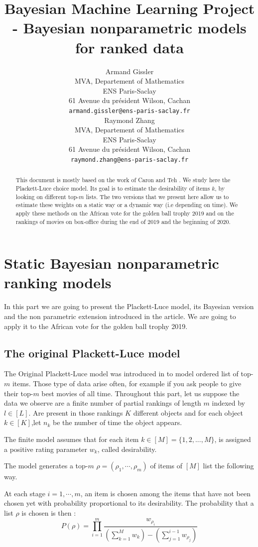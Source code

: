 \documentclass{article}
\title{Bayesian Machine Learning Project - Bayesian nonparametric models for ranked data}
\author{%
  Armand Gissler\\
  MVA, Departement of Mathematics\\
  ENS Paris-Saclay\\
  61 Avenue du président Wilson, Cachan \\
  \texttt{armand.gissler@ens-paris-saclay.fr} \\
  \And
  Raymond Zhang\\
  MVA, Departement of Mathematics\\
  ENS Paris-Saclay\\
  61 Avenue du président Wilson, Cachan \\
  \texttt{raymond.zhang@ens-paris-saclay.fr} \\
}
\begin{document}
\maketitle

\begin{abstract}
  This document is mostly based on the work of Caron and Teh \cite{caron_bayesian_nodate,caron_bayesian_nodate-supmat}. We study here the Plackett-Luce choice model. Its goal is to estimate the desirability of items $k$, by looking on different top-$m$ lists. The two versions that we present here allow us to estimate these weights on a static way or a dynamic way (i.e depending on time). We apply these methods on the African vote for the golden ball trophy 2019 and on the rankings of movies on box-office during the end of 2019 and the beginning of 2020. 
\end{abstract}

\section{Static Bayesian nonparametric ranking models}
In this part we are going to present the Plackett-Luce model, its Bayesian version and the non parametric extension introduced in the article. We are going to apply it to the African vote for the golden ball trophy 2019.

\subsection{The original Plackett-Luce model}

The Original Plackett-Luce model was introduced in \cite{luce2012individual} to model ordered list of top-$m$ items. Those type of data arise often, for example if you ask people to give their top-$m$ best movies of all time. Throughout this part, let us suppose the data we observe are a finite number of partial rankings of length $m$ indexed by $l \in [L]$. Are present in those rankings $K$ different objects and for each object $k\in [K]$,let $n_k$ be the number of time the object appears.

The finite model assumes that for each item $k \in [M] = \{1,2,...,M\}$, is assigned a positive rating parameter $w_k$, called desirability. 

The model generates a top-$m$  $\rho=(\rho_1,\cdots,\rho_m)$ of items of $[M]$ list the following way.

At each stage $i=1,\cdots,m$, an item is chosen among the items that have not been chosen yet with probability proportional to its desirability. The probability that a list $\rho$ is chosen is then :
\begin{equation}
P(\rho) = \prod_{i=1}^m\frac{w_{\rho_i}}{\left(\sum_{k=1}^M w_k\right) -\left(\sum_{j=1}^{i-1}w_{\rho_j}\right)}
\label{finit_rank}
\end{equation}
\end{document}
